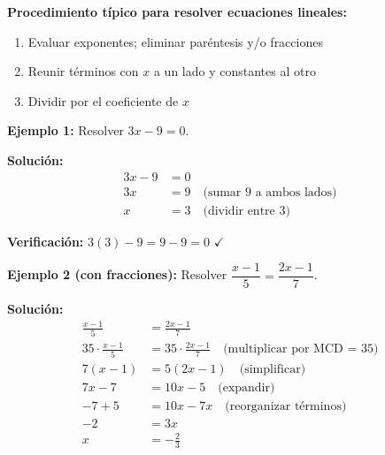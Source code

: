 \begin{center}
\end{center}

\textbf{Procedimiento típico para resolver ecuaciones lineales:}
\begin{enumerate}
\item Evaluar exponentes; eliminar paréntesis y/o fracciones
\item Reunir términos con $x$ a un lado y constantes al otro
\item Dividir por el coeficiente de $x$
\end{enumerate}

\begin{example}
\textbf{Ejemplo 1:} Resolver $3x - 9 = 0$.

\textbf{Solución:}
\begin{align}
3x - 9 &= 0\\
3x &= 9 \quad \text{(sumar 9 a ambos lados)}\\
x &= 3 \quad \text{(dividir entre 3)}
\end{align}

\textbf{Verificación:} $3(3) - 9 = 9 - 9 = 0$ $\checkmark$
\end{example}

\begin{example}
\textbf{Ejemplo 2 (con fracciones):} Resolver $\dfrac{x-1}{5} = \dfrac{2x-1}{7}$.

\textbf{Solución:}
\begin{align}
\frac{x-1}{5} &= \frac{2x-1}{7}\\
35 \cdot \frac{x-1}{5} &= 35 \cdot \frac{2x-1}{7} \quad \text{(multiplicar por MCD = 35)}\\
7(x-1) &= 5(2x-1) \quad \text{(simplificar)}\\
7x - 7 &= 10x - 5 \quad \text{(expandir)}\\
-7 + 5 &= 10x - 7x \quad \text{(reorganizar términos)}\\
-2 &= 3x\\
x &= -\frac{2}{3}
\end{align}
\end{example}

